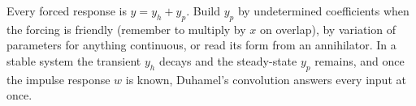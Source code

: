 \begin{conceptbox}
Every forced response is \textcolor{accentorange}{$y = y_h + y_p$}. Build $y_p$ by
\textcolor{accentorange}{undetermined coefficients} when the forcing is friendly
(remember to \textcolor{accentorange}{multiply by $x$} on overlap), by
\textcolor{accentorange}{variation of parameters} for anything continuous, or read
its form from an \textcolor{accentorange}{annihilator}. In a stable system the
\textcolor{accentorange}{transient} $y_h$ decays and the
\textcolor{accentorange}{steady-state} $y_p$ remains, and once the
\textcolor{accentorange}{impulse response $w$} is known,
\textcolor{accentorange}{Duhamel's convolution} answers every input at once.
\end{conceptbox}


